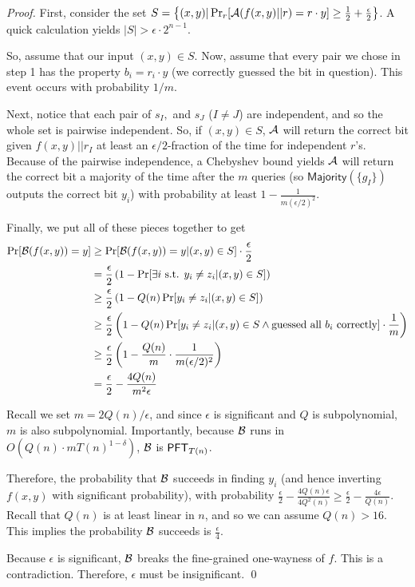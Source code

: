 \begin{proof}
	First, consider the set $S = \left\{ (x,y) | \Pr_r[\mathcal{A}(f(x,y)||r) = r\cdot y] \ge \frac 1 2 + \frac \epsilon 2 \right\}$. A quick calculation yields $|S| > \epsilon\cdot 2^{n-1}$.
	
	So, assume that our input $(x,y) \in S$. Now, assume that every pair we chose in step 1 has the property $b_i = r_i \cdot y$ (we correctly guessed the bit in question). This event occurs with probability $1/m$.
	
	Next, notice that each pair of $s_I,$ and $s_{J}$ ($I \neq J$) are independent, and so the whole set is pairwise independent. So, if $(x, y)\in S$, $\mathcal{A}$ will return the correct bit given $f(x,y)||r_I$ at least an $\epsilon/2$-fraction of the time for independent $r$'s. Because of the pairwise independence, a Chebyshev bound yields $\mathcal{A}$ will return the correct bit a majority of the time after the $m$ queries (so $\mathsf{Majority}(\{g_I\})$ outputs the correct bit $y_i$) with probability at least $1-\frac 1 {m(\epsilon/2)^2}$.
	
	Finally, we put all of these pieces together to get
	\begin{align*}
	\Pr[{\cal B}(f(x,y)) = y] & \ge \Pr[{\cal B}(f(x,y)) = y | (x,y)\in S ] \cdot \frac \epsilon 2\\
	&= \frac \epsilon 2 \left( 1 - \Pr[\exists i \mbox{ s.t. } y_i \neq z_i | (x,y) \in S] \right)\\
	&\ge \frac \epsilon 2 \left(1 - Q(n)\Pr[y_i \neq z_i | (x,y) \in S]\right)\\
	&\ge \frac \epsilon 2 \left(1 - Q(n)\Pr[y_i \neq z_i | (x,y) \in S \land \mbox{guessed all $b_i$ correctly}]\cdot \frac 1 m\right)\\
	&\ge \frac \epsilon 2 \left(1 - \frac {Q(n)}{m} \cdot \frac{1}{m(\epsilon/2)^2} \right)\\
	&= \frac \epsilon 2 - \frac{4Q(n)}{m^2\epsilon}
	\end{align*}
	
	Recall we set $m = 2Q(n)/\epsilon$, and since $\epsilon$ is significant and $Q$ is subpolynomial, $m$ is also subpolynomial. Importantly, because ${\cal B}$ runs in $O(Q(n) \cdot m T(n)^{1-\delta})$, ${\cal B}$ is $\mathsf{PFT}_{T(n)}$.
	
	Therefore, the probability that ${\cal B}$ succeeds in finding $y_i$ (and hence inverting $f(x,y)$ with significant probability), with probability $\frac \epsilon 2 - \frac{4 Q(n)\epsilon}{4Q^2(n)} \ge  \frac \epsilon 2 - \frac{4\epsilon}{Q(n)}$. Recall that $Q(n)$ is at least linear in $n$, and so we can assume $Q(n) > 16$. This implies the probability ${\cal B}$ succeeds is $\frac \epsilon 4$. 
	
	Because $\epsilon$ is significant, ${\cal B}$ breaks the fine-grained one-wayness of $f$. This is a contradiction. Therefore, $\epsilon$ must be insignificant.
	\qed
\end{proof}

